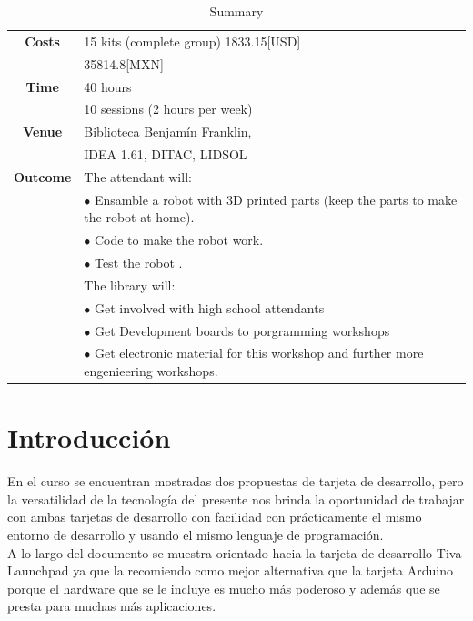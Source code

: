 \documentclass[]{article}
\begin{document}
\begin{table}[h!]
\begin{tabular}{||c|l||}
		\textbf{Costs} & 15 kits (complete group)  1833.15[USD]  \\[0.5ex] 
		& 35814.8[MXN]  \\[0.5ex] \hline
		
		\textbf{Time} & 40 hours\\[0.5ex]
		             & 10 sessions (2 hours per week)   \\[0.5ex]
		 \hline
		
		\textbf{Venue} & Biblioteca Benjamín Franklin,\\[0.5ex]  
	                   & IDEA 1.61, DITAC, LIDSOL  	\\[0.5ex] \hline
		
		\textbf{Outcome} &    The attendant will:\\[0.5ex]
		& $\bullet$ Ensamble a robot with 3D printed parts (keep the parts to make the robot at home). \\[0.5ex]
		& $\bullet$ Code to make the robot work. \\[0.5ex] 
		& $\bullet$ Test the robot . \\[0.5ex]
	    & The library will:\\[0.5ex]
	    &  $\bullet$ Get involved with high school attendants \\[0.5ex]
	    &  $\bullet$ Get Development boards to porgramming workshops \\[0.5ex]
	    &  $\bullet$ Get electronic material for this workshop and further more engenieering workshops. \\[0.5ex]
		\hline
		
	\end{tabular}
	\caption{Summary}
	
\end{table}

\section{Introducción}

En el curso se encuentran mostradas dos propuestas de tarjeta de desarrollo, pero la versatilidad de la tecnología del presente nos brinda la oportunidad de trabajar con ambas tarjetas de desarrollo con facilidad con prácticamente el mismo entorno de desarrollo y usando el mismo lenguaje de programación.\\

A lo largo del documento se muestra orientado hacia la tarjeta de desarrollo Tiva Launchpad ya que la recomiendo como mejor alternativa que la tarjeta Arduino porque el hardware que se le incluye es mucho más poderoso y además que se presta para muchas más aplicaciones.\\
\end{document}
